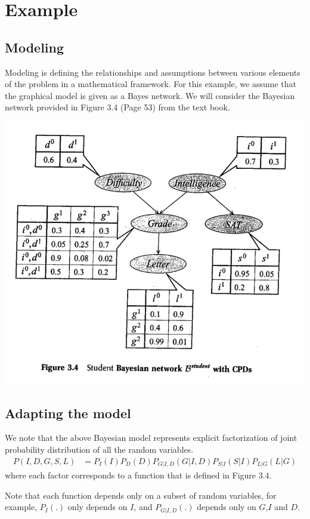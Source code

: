 \documentclass[12pt,oneside,letterpaper]{article}
\begin{document}
\section{Example}
\subsection{Modeling}
Modeling is defining the relationships and assumptions between various elements
of the problem in a mathematical framework. For this example, we assume that
the graphical model is given as a Bayes network.  We will consider the Bayesian
network provided in Figure 3.4 (Page 53) from the text book.

\includegraphics[width=\textwidth]{media/examplebayesnet.png}

\subsection{Adapting the model}
We note that the above Bayesian model represents explicit factorization of
joint probability distribution of all the random variables.
\begin{align}
  P(I, D, G, S, L) &= P_I(I)P_D(D)P_{G|I,D}(G|I, D)P_{S|I}(S|I)P_{L|G}(L|G)
\end{align}
where each factor corresponds to a function that is defined in Figure 3.4.

Note that each function depends only on a subset of random variables, for
example, $P_I(.)$ only depends on $I$, and $P_{G|I,D}(.)$ depends only on
$G$,$I$ and $D$.
\end{document}
